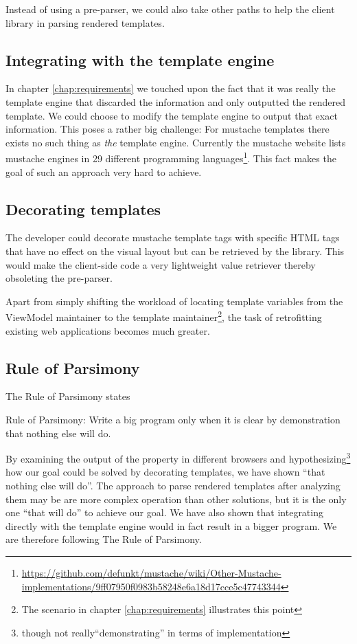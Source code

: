 \documentclass[thesis.tex]{subfiles}
\begin{document}
Instead of using a pre-parser, we could also take other paths to help
the client library in parsing rendered templates.

\subsection{Integrating with the template engine}

In chapter \ref{chap:requirements} we touched upon the fact that it was really
the template engine that discarded the information and only outputted the
rendered template. We could choose to modify the template engine to output that
exact information. This poses a rather big challenge:
For mustache templates there exists no such thing as \emph{the} template engine.
Currently the mustache website lists mustache engines in 29 different
programming languages\footnote{\url{https://github.com/defunkt/mustache/wiki/Other-Mustache-implementations/9ff07950f0983b58248e6a18d17cce5c47743344}}.
This fact makes the goal of such an approach very hard to achieve.

\subsection{Decorating templates}

The developer could decorate mustache template tags with specific HTML tags that
have no effect on the visual layout but can be retrieved by the library.
This would make the client-side code a very lightweight value retriever
thereby obsoleting the pre-parser.

Apart from simply shifting the workload of locating template variables
from the ViewModel maintainer to the template maintainer\footnote{The scenario
in chapter \ref{chap:requirements} illustrates this point},
the task of retrofitting existing web applications becomes much greater.

\subsection{Rule of Parsimony}
\label{sec:parsimony}
The Rule of Parsimony states
\begin{citequote}{\cite[Chapter 1]{UXART}}
Rule of Parsimony: Write a big program only when it is clear by demonstration
that nothing else will do.
\end{citequote}

By examining the output of the  property in different browsers
and hypothesizing\footnote{though not really``demonstrating'' in terms of
implementation} how our goal could be solved by decorating templates,
we have shown ``that nothing else will do''.
The approach to parse rendered templates after analyzing them may be are
more complex operation than other solutions, but it is the only one
``that will do'' to achieve our goal. We have also shown that integrating
directly with the template engine would in fact result in a bigger program.
We are therefore following The Rule of Parsimony.
\end{document}
